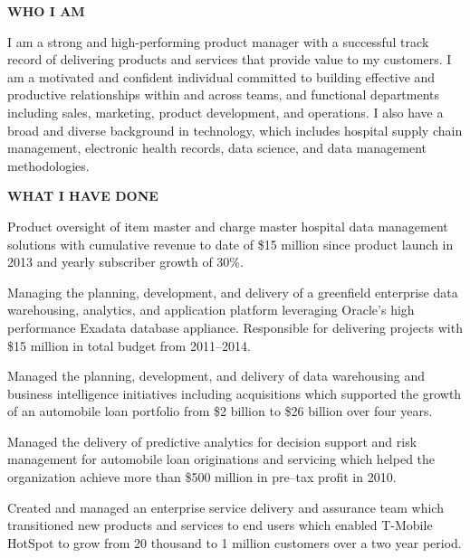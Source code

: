 \documentclass{article}
\newcommand{\sbt}{\,\begin{picture}(-1,1)(-1,-3)\circle*{3}\end{picture}\ }
\newenvironment{tightcenter}{%
  \setlength\topsep{0pt}
  \setlength\parskip{10pt}
  \begin{center}
}{%
  \end{center}
}
\begin{document}
\begin{tightcenter}
{\bfseries \large WHO I AM}
\end{tightcenter}

\noindent
I am a strong and high-performing product manager with a successful track record of delivering products and services that provide value to my customers. I am a motivated and confident individual committed to building effective and productive relationships within and across teams, and functional departments including sales, marketing, product development, and operations. I also have a broad and diverse background in technology, which includes hospital supply chain management, electronic health records, data science, and data management methodologies.

\begin{tightcenter}
{\bfseries \large WHAT I HAVE DONE}
\end{tightcenter}

\begin{compactitem}

\item[\sbt] Product oversight of item master and charge master hospital data management solutions with cumulative revenue to date of \$15 million since product launch in 2013 and yearly subscriber growth of 30\%.
\item[\sbt] Managing the planning, development, and delivery of a greenfield enterprise data warehousing, analytics, and application platform leveraging Oracle's high performance Exadata database appliance. Responsible for delivering projects with \$15 million in total budget from 2011--2014.
\item[\sbt] Managed the planning, development, and delivery of data warehousing and business intelligence initiatives including acquisitions which supported the growth of an automobile loan portfolio from \$2 billion to \$26 billion over four years.
\item[\sbt] Managed the delivery of predictive analytics for decision support and risk management for automobile loan originations and servicing which helped the organization achieve more than \$500 million in pre--tax profit in 2010.
\item[\sbt] Created and managed an enterprise service delivery and assurance team which transitioned new products and services to end users which enabled T-Mobile HotSpot to grow from 20 thousand to 1 million customers over a two year period.

\end{compactitem}
\end{document}
